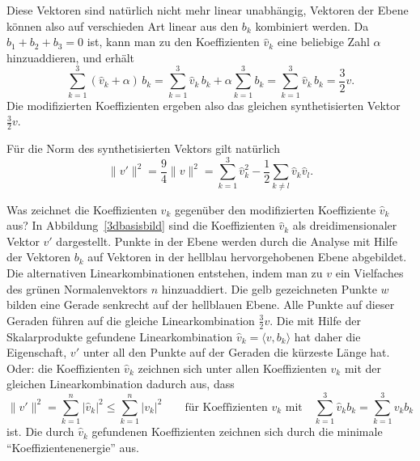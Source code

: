 Diese Vektoren sind natürlich nicht mehr linear unabhängig, Vektoren
der Ebene können also auf verschieden Art linear aus den $b_k$ kombiniert
werden.
Da $b_1+b_2+b_3=0$ ist, kann man zu den Koeffizienten $\hat{v}_k$
eine beliebige Zahl $\alpha$ hinzuaddieren, und erhält
\[
\sum_{k=1}^3 (\hat{v}_k+\alpha)\, b_k
=
\sum_{k=1}^3 \hat{v}_k\,b_k
+\alpha
\sum_{k=1}^3 b_k
=
\sum_{k=1}^3 \hat{v}_k\,b_k
=
\frac32 v.
\]
Die modifizierten Koeffizienten ergeben also das gleichen synthetisierten
Vektor $\frac32 v$.

Für die Norm des synthetisierten Vektors gilt natürlich
\[
\|v'\|^2
=
\frac94\|v\|^2
=
\sum_{k=1}^3 \hat{v}_k^2 
-
\frac12\sum_{k\ne l} \hat{v}_k\hat{v}_l.
\]


Was zeichnet die Koeffizienten $\hat{v}_k$ gegenüber den modifizierten
Koeffiziente $\hat{v}_k$ aus?
In Abbildung~\ref{3dbasisbild} sind die Koeffizienten $\hat{v}_k$ als
dreidimensionaler Vektor $v'$ dargestellt.
Punkte in der Ebene werden durch die Analyse mit Hilfe der Vektoren $b_k$
auf Vektoren in der hellblau hervorgehobenen Ebene abgebildet.
Die alternativen Linearkombinationen entstehen, indem man zu $v$
ein Vielfaches des grünen Normalenvektors $n$ hinzuaddiert.
Die gelb gezeichneten Punkte $w$ bilden eine Gerade senkrecht
auf der hellblauen Ebene.
Alle Punkte auf dieser Geraden führen auf die gleiche
Linearkombination $\frac32v$.
Die mit Hilfe der Skalarprodukte gefundene Linearkombination
$\hat{v}_k=\langle v,b_k\rangle$ hat daher die Eigenschaft, 
$v'$ unter all den Punkte auf der Geraden die kürzeste Länge hat.
Oder: die Koeffizienten $\hat{v}_k$ zeichnen sich unter allen
Koeffizienten $v_k$ mit der gleichen Linearkombination dadurch aus, 
dass
\begin{equation}
\|v'\|^2
=
\sum_{k=1}^n |\hat{v}_k|^2
\le
\sum_{k=1}^n |v_k|^2
\qquad
\text{für Koeffizienten $v_k$ mit}
\quad
\sum_{k=1}^3 \hat{v}_kb_k
=
\sum_{k=1}^3 v_kb_k
\label{hexagonbasiseigenschaft}
\end{equation}
ist.
Die durch $\hat{v}_k$ gefundenen Koeffizienten zeichnen sich durch
die minimale ``Koeffizientenenergie'' aus.

